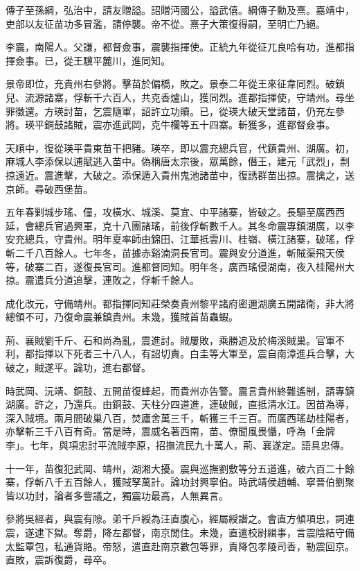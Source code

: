 \begin{pinyinscope}
傳子至孫綱，弘治中，請友贈謚。詔贈沔國公，謚武僖。綱傳子勳及熹。嘉靖中，吏部以友征苗功多冒濫，請停襲。帝不從。熹子大策復得嗣，至明亡乃絕。

李震，南陽人。父謙，都督僉事，震襲指揮使。正統九年從征兀良哈有功，進都指揮僉事。已，從王驥平麓川，進同知。

景帝即位，充貴州右參將。擊苗於偏橋，敗之。景泰二年從王來征韋同烈。破鎖兒、流源諸寨，俘斬千六百人，共克香爐山，獲同烈。進都指揮使，守靖州。尋坐罪徵還。方瑛討苗，乞震隨軍，詔許立功贖。已，從瑛大破天堂諸苗，仍充左參將。瑛平銅鼓諸賊，震亦進武岡，克牛欄等五十四寨。斬獲多，進都督僉事。

天順中，復從瑛平貴東苗干把豬。瑛卒，即以震充總兵官，代鎮貴州、湖廣。初，麻城人李添保以逋賦逃入苗中。偽稱唐太宗後，眾萬餘，僭王，建元「武烈」，剽掠遠近。震進擊，大破之。添保遁入貴州鬼池諸苗中，復誘群苗出掠。震擒之，送京師。尋破西堡苗。

五年春剿城步瑤、僮，攻橫水、城溪、莫宜、中平諸寨，皆破之。長驅至廣西西延，會總兵官過興軍，克十八團諸瑤，前後俘斬數千人。其冬命震專鎮湖廣，以李安充總兵，守貴州。明年夏率師由錦田、江華抵雲川、桂嶺、橫江諸寨，破瑤，俘斬二千八百餘人。七年冬，苗據赤谿湳洞長官司。震與安分道進，斬賊渠飛天侯等，破寨二百，遂復長官司。進都督同知。明年冬，廣西瑤侵湖南，夜入桂陽州大掠。震遣兵分道追擊，連敗之，俘斬千餘人。

成化改元，守備靖州。都指揮同知莊榮奏貴州黎平諸府密邇湖廣五開諸衛，非大將總領不可，乃復命震兼鎮貴州。未幾，獲賊首苗蟲蝦。

荊、襄賊劉千斤、石和尚為亂，震進討。賊屢敗，乘勝追及於梅溪賊巢。官軍不利，都指揮以下死者三十八人，有詔切責。白圭等大軍至，震自南漳進兵合擊，大破之，賊遂平。論功，進右都督。

時武岡、沅靖、銅鼓、五開苗復蜂起，而貴州亦告警。震言貴州終難遙制，請專鎮湖廣。許之，乃還兵。由銅鼓、天柱分四道進，連破賊，直抵清水江。因苗為導，深入賊境。兩月間破巢八百，焚廬舍萬三千，斬獲三千三百。而廣西瑤劫桂陽者，亦擊斬三千八百有奇。當是時，震威名著西南，苗、僚聞風畏懾，呼為「金牌李」。七年，與項忠討平流賊李原，招撫流民九十萬人，荊、襄遂定。語具忠傳。

十一年，苗復犯武岡、靖州，湖湘大擾。震與巡撫劉敷等分五道進，破六百二十餘寨，俘斬八千五百餘人，獲賊孥萬計。論功封興寧伯。時武靖侯趙輔、寧晉伯劉聚皆以功封，論者多訾議之，獨震功最高，人無異言。

參將吳經者，與震有隙。弟千戶綬為汪直腹心，經屬綬譖之。會直方傾項忠，詞連震，遂逮下獄。奪爵，降左都督，南京閒住。未幾，直遣校尉緝事，言震陰結守備太監覃包，私通貨賂。帝怒，遣直赴南京數包等罪，責降包孝陵司香，勒震回京。直敗，震訴復爵，尋卒。


\end{pinyinscope}
